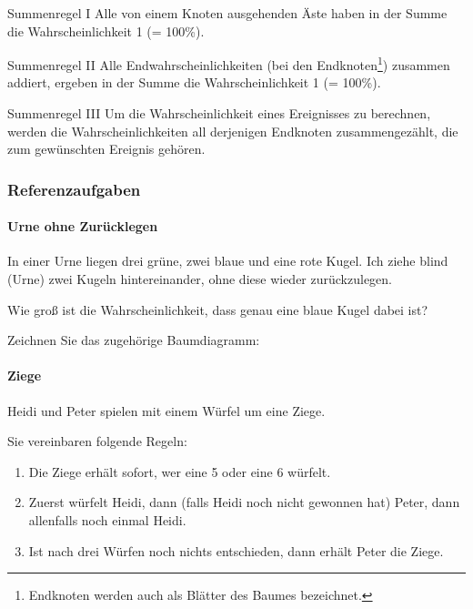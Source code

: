 \leserluft\leserluft

\begin{gesetz}{Summenregel I}{}
Alle von einem Knoten ausgehenden Äste haben in der Summe die Wahrscheinlichkeit 1 (= 100\%).
\end{gesetz}

\begin{gesetz}{Summenregel II}{}
Alle Endwahrscheinlichkeiten (bei den Endknoten\footnote{Endknoten werden auch als Blätter des Baumes bezeichnet.}) zusammen addiert, ergeben in der Summe die Wahrscheinlichkeit 1 (= 100\%).
\end{gesetz}

\begin{gesetz}{Summenregel III}{}
  Um die Wahrscheinlichkeit eines Ereignisses zu berechnen, werden die
  Wahrscheinlichkeiten all derjenigen Endknoten zusammengezählt, die zum gewünschten Ereignis gehören.
  \end{gesetz}

\newpage


\subsubsection{Referenzaufgaben}

\paragraph{Urne ohne Zurücklegen} In einer Urne liegen drei grüne, zwei blaue und eine rote Kugel. Ich ziehe blind (Urne) zwei Kugeln hintereinander, ohne diese wieder zurückzulegen.

Wie groß ist die Wahrscheinlichkeit, dass genau eine blaue Kugel dabei ist?

Zeichnen Sie das zugehörige Baumdiagramm:

  
\newpage

\paragraph{Ziege} Heidi und Peter spielen mit einem Würfel um eine Ziege.

Sie vereinbaren folgende Regeln:

\begin{enumerate}
\item Die Ziege erhält sofort, wer eine 5 oder eine 6 würfelt.
\item Zuerst würfelt Heidi, dann (falls Heidi noch nicht gewonnen hat) Peter, dann allenfalls noch einmal Heidi.
\item Ist nach drei Würfen noch nichts entschieden, dann erhält Peter die Ziege.
\end{enumerate}


